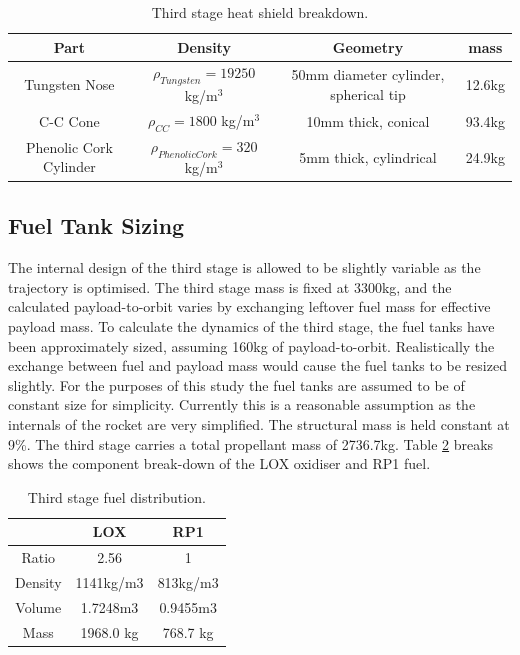 		\begin{table}[h]
			\centering
\begin{tabular}{|c|c|c|c|}
	\hline  Part & Density & Geometry & mass \\ 
	\hline  Tungsten Nose & $\rho_{Tungsten} = 19250$  kg/m$^3$ & 50mm diameter cylinder, spherical tip & 12.6kg \\ 
		\hline C-C Cone & $\rho_{CC} = 1800$  kg/m$^3$ & 10mm thick, conical & 93.4kg \\ 
			\hline Phenolic Cork Cylinder & $\rho_{Phenolic Cork} = 320$  kg/m$^3$ & 5mm thick, cylindrical & 24.9kg \\ 
	\hline 
\end{tabular} 
\caption{Third stage heat shield breakdown.}
\label{tab:heatshield}
\end{table}
		
		\subsection{Fuel Tank Sizing}
		The internal design of the third stage is allowed to be slightly variable as the trajectory is optimised. The third stage mass is fixed at 3300kg, and the calculated payload-to-orbit varies by exchanging leftover fuel mass for effective payload mass. To calculate the dynamics of the third stage, the fuel tanks have been approximately sized, assuming 160kg of payload-to-orbit. Realistically the exchange between fuel and payload mass would cause the fuel tanks to be resized slightly. For the purposes of this study the fuel tanks are assumed to be of constant size for simplicity. Currently this is a reasonable assumption as the internals of the rocket are very simplified. The structural mass is held constant at 9\%. The third stage carries a total propellant mass of 2736.7kg. Table \ref{tab:Fuel} breaks shows the component break-down of the LOX oxidiser and RP1 fuel.  
		
		\begin{table}[h]
			\centering
\begin{tabular}{|c|c|c|}
	\hline  & \textbf{LOX} & \textbf{RP1} \\ 
	\hline Ratio & 2.56 & 1 \\ 
	\hline Density & 1141kg/m3 & 813kg/m3 \cite{Magee}\\ 
	\hline Volume & 1.7248m3 & 0.9455m3 \\ 
	\hline Mass & 1968.0 kg & 768.7 kg \\ 
	\hline 
\end{tabular} 
\caption{Third stage fuel distribution.}
\label{tab:Fuel}
		\end{table}

